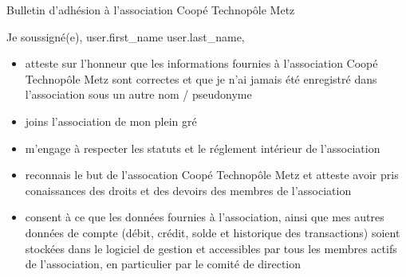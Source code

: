 \documentclass[a4paper, 12pt]{article}
\begin{document}
\vspace*{0.3\baselineskip}
\begin{center}
\huge{Bulletin d'adhésion à l'association Coopé Technopôle Metz}
\end{center}
\vspace*{\baselineskip}
Je soussigné(e), {{user.first_name}} {{user.last_name}},
\begin{itemize}
\item atteste sur l'honneur que les informations fournies à l'association Coopé Technopôle Metz sont correctes et que je n'ai jamais été enregistré dans l'association sous un autre nom / pseudonyme
\item joins l'association de mon plein gré
\item m'engage à respecter les statuts et le réglement intérieur de l'association
\item reconnais le but de l'assocation Coopé Technopôle Metz et atteste avoir pris conaissances des droits et des devoirs des membres de l'association
\item consent à ce que les données fournies à l'association, ainsi que mes autres données de compte (débit, crédit, solde et historique des transactions) soient stockées dans le logiciel de gestion et accessibles par tous les membres actifs de l'association, en particulier par le comité de direction
\end{itemize}
\end{document}
